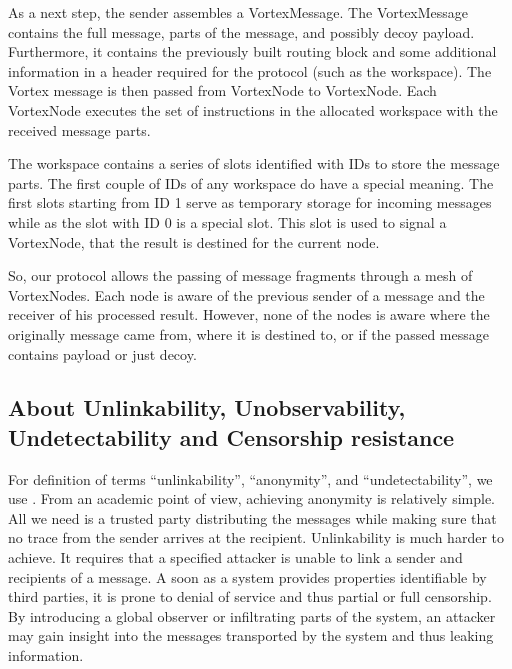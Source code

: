 \documentclass[10pt,journal,compsoc,twocolumn,twoside]{IEEEtran}
\begin{document}
As a next step, the sender assembles a VortexMessage. The VortexMessage contains the full message, parts of the message, and possibly decoy payload. Furthermore, it contains the previously built routing block and some additional information in a header required for the protocol (such as the workspace). The Vortex message is then passed from VortexNode to VortexNode. Each VortexNode executes the set of instructions in the allocated workspace with the received message parts. 

The workspace contains a series of slots identified with IDs to store the message parts. The first couple of IDs of any workspace do have a special meaning. The first slots starting from ID 1 serve as temporary storage for incoming messages while as the slot with ID 0 is a special slot. This slot is used to signal a VortexNode, that the result is destined for the current node.

So, our protocol allows the passing of message fragments through a mesh of VortexNodes. Each node is aware of the previous sender of a message and the receiver of his processed result. However, none of the nodes is aware where the originally message came from, where it is destined to, or if the passed message contains payload or just decoy. %

\subsection{About Unlinkability, Unobservability, Undetectability and Censorship resistance}
For definition of terms ``unlinkability'', ``anonymity'', and ``undetectability'', we use \cite{anon_terminology}. From an academic point of view, achieving anonymity is relatively simple. All we need is a trusted party distributing the messages while making sure that no trace from the sender arrives at the recipient. Unlinkability is much harder to achieve. It requires that a specified attacker is unable to link a sender and recipients of a message. A soon as a system provides properties identifiable by third parties, it is prone to denial of service and thus partial or full censorship. By introducing a global observer or infiltrating parts of the system, an attacker may gain insight into the messages transported by the system and thus leaking information.
\end{document}
